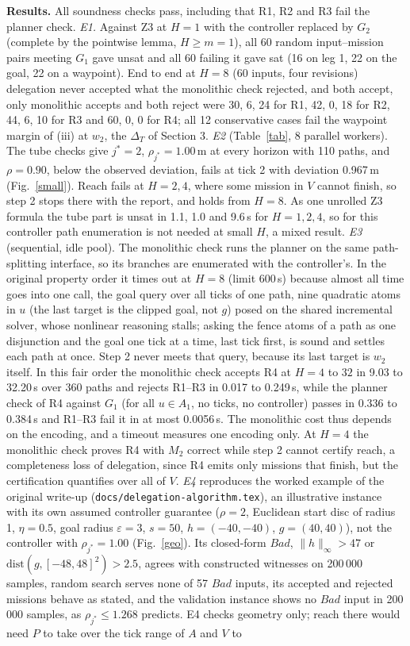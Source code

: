 \documentclass[10pt,a4paper]{article}
\newcommand{\Bad}{\mathit{Bad}}
\newcommand{\lt}[1]{\texttt{#1}}
\begin{document}
\textbf{Results.} All soundness checks pass, including that R1, R2 and R3 fail the planner check. \emph{E1.} Against Z3 at $H=1$ with the controller replaced by $G_2$ (complete by the pointwise lemma, $H\ge m=1$), all 60 random input--mission pairs meeting $G_1$ gave unsat and all 60 failing it gave sat (16 on leg 1, 22 on the goal, 22 on a waypoint). End to end at $H=8$ (60 inputs, four revisions) delegation never accepted what the monolithic check rejected, and both accept, only monolithic accepts and both reject were 30, 6, 24 for R1, 42, 0, 18 for R2, 44, 6, 10 for R3 and 60, 0, 0 for R4; all 12 conservative cases fail the waypoint margin of (iii) at $w_2$, the $\Delta_T$ of Section 3. \emph{E2} (Table~\ref{tab}, 8 parallel workers). The tube checks give $j^*=2$, $\rho_{j^*}=1.00$\,m at every horizon with 110 paths, and $\rho=0.90$, below the observed deviation, fails at tick 2 with deviation 0.967\,m (Fig.~\ref{small}). Reach fails at $H=2,4$, where some mission in $V$ cannot finish, so step 2 stops there with the report, and holds from $H=8$. As one unrolled Z3 formula the tube part is unsat in 1.1, 1.0 and 9.6\,s for $H=1,2,4$, so for this controller path enumeration is not needed at small $H$, a mixed result. \emph{E3} (sequential, idle pool). The monolithic check runs the planner on the same path-splitting interface, so its branches are enumerated with the controller's. In the original property order it times out at $H=8$ (limit 600\,s) because almost all time goes into one call, the goal query over all ticks of one path, nine quadratic atoms in $u$ (the last target is the clipped goal, not $g$) posed on the shared incremental solver, whose nonlinear reasoning stalls; asking the fence atoms of a path as one disjunction and the goal one tick at a time, last tick first, is sound and settles each path at once. Step 2 never meets that query, because its last target is $w_2$ itself. In this fair order the monolithic check accepts R4 at $H=4$ to $32$ in 9.03 to 32.20\,s over 360 paths and rejects R1--R3 in 0.017 to 0.249\,s, while the planner check of R4 against $G_1$ (for all $u\in A_1$, no ticks, no controller) passes in 0.336 to 0.384\,s and R1--R3 fail it in at most 0.0056\,s. The monolithic cost thus depends on the encoding, and a timeout measures one encoding only. At $H=4$ the monolithic check proves R4 with $M_2$ correct while step 2 cannot certify reach, a completeness loss of delegation, since R4 emits only missions that finish, but the certification quantifies over all of $V$. \emph{E4} reproduces the worked example of the original write-up (\lt{docs/delegation-algorithm.tex}), an illustrative instance with its own assumed controller guarantee ($\rho=2$, Euclidean start disc of radius 1, $\eta=0.5$, goal radius $\varepsilon=3$, $s=50$, $h=(-40,-40)$, $g=(40,40)$), not the controller with $\rho_{j^*}=1.00$ (Fig.~\ref{geo}). Its closed-form $\Bad$, $\lVert h\rVert_\infty>47$ or $\mathrm{dist}(g,[-48,48]^2)>2.5$, agrees with constructed witnesses on 200\,000 samples, random search serves none of 57 $\Bad$ inputs, its accepted and rejected missions behave as stated, and the validation instance shows no $\Bad$ input in 200\,000 samples, as $\rho_{j^*}\le1.268$ predicts. E4 checks geometry only; reach there would need $P$ to take over the tick range of $A$ and $V$ to 
\end{document}
